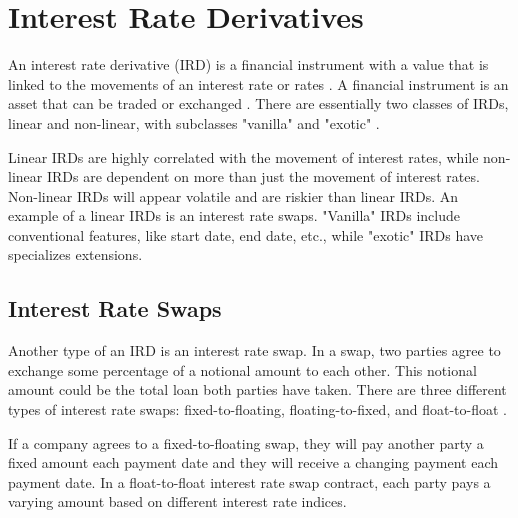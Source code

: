 \newpage

\section{Interest Rate Derivatives}

\noindent An interest rate derivative (IRD) is a financial instrument with a value that is linked to the movements of an interest rate or rates \cite{investopedia_interest_rate_derivative}. A financial instrument is an asset that can be traded or exchanged \cite{investopedia_financial_instruments}. There are essentially two classes of IRDs, linear and non-linear, with subclasses "vanilla" and "exotic" \cite{cfi_interest_rate_derivatives}.


Linear IRDs are highly correlated with the movement of interest rates, while non-linear IRDs are dependent on more than just the movement of interest rates. Non-linear IRDs will appear volatile and are riskier than linear IRDs. An example of a linear IRDs is an interest rate swaps. "Vanilla" IRDs include conventional features, like start date, end date, etc., while "exotic" IRDs have specializes extensions. \cite{cfi_interest_rate_derivatives}


\subsection{Interest Rate Swaps}

\noindent Another type of an IRD is an interest rate swap. In a swap, two parties agree to exchange some percentage of a notional amount to each other. This notional amount could be the total loan both parties have taken. There are three different types of interest rate swaps: fixed-to-floating, floating-to-fixed, and float-to-float \cite{investopedia_swap}.

If a company agrees to a fixed-to-floating swap, they will pay another party a fixed amount each payment date and they will receive a changing payment each payment date. In a float-to-float interest rate swap contract, each party pays a varying amount based on different interest rate indices. \cite{investopedia_swap}


